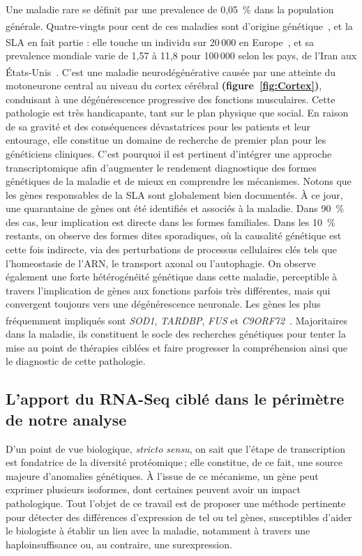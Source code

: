 Une maladie rare se définit par une \gls{prevalence} de 0,05~\% dans la population générale.  
Quatre-vingts pour cent de ces maladies sont d’origine génétique~\textsuperscript{\cite{SLA_protocole_2020}},  
et la SLA en fait partie : elle touche un individu sur 20\,000 en Europe~\textsuperscript{\cite{M.rare_prevalence_2023}},  
et sa prevalence mondiale varie de 1{,}57 à 11{,}8 pour 100\,000 selon les pays, de l’Iran aux États-Unis~\textsuperscript{\cite{SLA_prevalence_2023}}.  
C’est une maladie neurodégénérative causée par une atteinte du motoneurone central au niveau du cortex cérébral \textbf{(figure~\ref{fig:Cortex})},  
conduisant à une dégénérescence progressive des fonctions musculaires. Cette pathologie est très handicapante, tant sur le plan physique que social.  
En raison de sa gravité et des conséquences dévastatrices pour les patients et leur entourage, elle constitue un domaine de recherche de premier plan pour les généticiens cliniques.  
C’est pourquoi il est pertinent d’intégrer une approche transcriptomique afin d’augmenter le rendement diagnostique des formes génétiques de la maladie et de mieux en comprendre les mécanismes.
Notons que les gènes responsables de la SLA sont globalement bien documentés. À ce jour, une quarantaine de gènes ont été identifiés et associés à la maladie.  
Dans 90~\% des cas, leur implication est directe dans les formes familiales. Dans les 10~\% restants, on observe des formes dites sporadiques,  
où la causalité génétique est cette fois indirecte, via des perturbations de processus cellulaires clés tels que l’\gls{homeostasie} de l’ARN, le \gls{transport axonal} ou l’\gls{autophagie}.    
On observe également une forte hétérogénéité génétique dans cette maladie, perceptible à travers l’implication de gènes aux fonctions parfois très différentes,  
mais qui convergent toujours vers une dégénérescence neuronale. Les gènes les plus fréquemment impliqués sont \textit{SOD1}, \textit{TARDBP}, \textit{FUS} et \textit{C9ORF72}~\textsuperscript{\cite{SLA_protocole_2020}}.  
Majoritaires dans la maladie, ils constituent le socle des recherches génétiques pour tenter la mise au point de thérapies ciblées et faire progresser la compréhension ainsi que le diagnostic de cette pathologie.

\subsection{L’apport du RNA-Seq ciblé dans le périmètre de notre analyse}

D’un point de vue biologique, \textit{stricto sensu}, on sait que l’étape de transcription est fondatrice de la diversité protéomique ;  
elle constitue, de ce fait, une source majeure d’anomalies génétiques. À l’issue de ce mécanisme, un gène peut exprimer plusieurs isoformes, dont certaines peuvent avoir un impact pathologique.  
Tout l’objet de ce travail est de proposer une méthode pertinente pour détecter des différences d’expression de tel ou tel gènes, susceptibles d’aider le biologiste à établir un lien avec la maladie,  
notamment à travers une \gls{haploinsuffisance} ou, au contraire, une surexpression.\\
 
